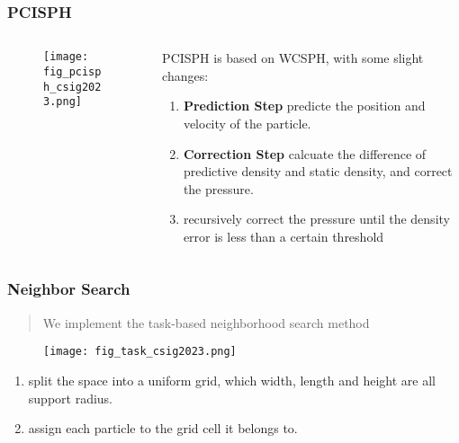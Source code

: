 \begin{frame}
    \frametitle{PCISPH}
    \begin{columns}[c]
        \begin{column}{0.38\textwidth} %
            \begin{figure}[H]
                \centering
                \texttt{[image: fig\_pcisph\_csig2023.png]}
            \end{figure}
        \end{column}
        \begin{column}{0.6\textwidth} %
            PCISPH is based on WCSPH, with some slight changes:
            \begin{enumerate}
                \item \textbf{Prediction Step} predicte the position and velocity of the particle.
                \item \textbf{Correction Step} calcuate the difference of predictive density and static density, and correct the pressure.
                \item recursively correct the pressure until the density error is less than a certain threshold\cite{solenthaler2009predictive} 
            \end{enumerate}
        \end{column}
    \end{columns}
\end{frame}

\begin{frame}
    \frametitle{Neighbor Search}
    \begin{quote}
        We implement the task-based neighborhood search method \cite{huangSPH2019}
    \end{quote}
    \begin{figure}[H]
        \centering
        \texttt{[image: fig\_task\_csig2023.png]}
    \end{figure}
    \begin{enumerate}
        \item split the space into a uniform grid, which width, length and height are all support radius.
        \item assign each particle to the grid cell it belongs to.
    \end{enumerate}
\end{frame}

